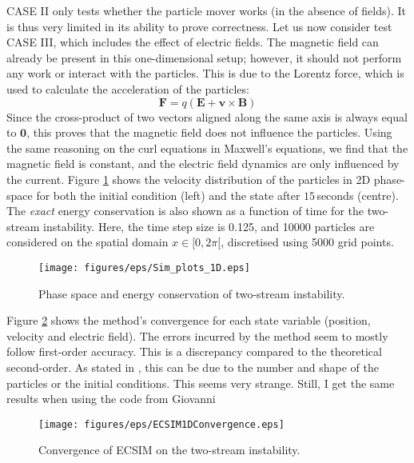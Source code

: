 CASE II only tests whether the particle mover works (in the absence of fields). It is thus very limited in its ability to prove correctness. Let us now consider test CASE III, which includes the effect of electric fields. The magnetic field can already be present in this one-dimensional setup; however, it should not perform any work or interact with the particles. This is due to the Lorentz force, which is used to calculate the acceleration of the particles: \[\textbf{F} = q\left(\textbf{E} + \textbf{v} \times \textbf{B}\right)\]
 Since the cross-product of two vectors aligned along the same axis is always equal to $\textbf{0}$, this proves that the magnetic field does not influence the particles. Using the same reasoning on the curl equations in Maxwell's equations, we find that the magnetic field is constant, and the electric field dynamics are only influenced by the current. 
 Figure \ref{fig: 1D-1V-sim} shows the velocity distribution of the particles in 2D phase-space for both the initial condition (left) and the state after $15$\,seconds (centre). The \textit{exact} energy conservation is also shown as a function of time for the two-stream instability. Here, the time step size is 0.125, and 10000 particles are considered on the spatial domain $x \in [0,2\pi[$, discretised using 5000 grid points.

\begin{figure}[h]
    \centering
    \texttt{[image: figures/eps/Sim\_plots\_1D.eps]}
    \caption{Phase space and energy conservation of two-stream instability. }
    \label{fig: 1D-1V-sim}
\end{figure}
Figure \ref{fig: 1D-1V-convergence} shows the method's convergence for each state variable (position, velocity and electric field). The errors incurred by the method seem to mostly follow first-order accuracy. This is a discrepancy compared to the theoretical second-order. As stated in \cite{lapenta_exactly_2017}, this can be due to the number and shape of the particles or the initial conditions. \color{red} This seems very strange. Still, I get the same results when using the code from Giovanni \color{black}
\begin{figure}[h]
    \centering
    \texttt{[image: figures/eps/ECSIM1DConvergence.eps]}
    \caption{Convergence of ECSIM on the two-stream instability.}
    \label{fig: 1D-1V-convergence}
\end{figure}

